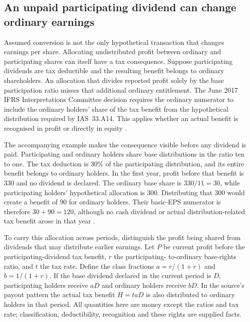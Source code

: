 \subsection{An unpaid participating dividend can change ordinary earnings}
\label{participating-tax-allocation}

Assumed conversion is not the only hypothetical transaction that changes
earnings per share. Allocating undistributed profit between ordinary and
participating shares can itself have a tax consequence. Suppose participating
dividends are tax deductible and the resulting benefit belongs to ordinary
shareholders. An allocation that divides reported profit solely by the base
participation ratio misses that additional ordinary entitlement. The June 2017
IFRS Interpretations Committee decision requires the ordinary numerator to
include the ordinary holders' share of the tax benefit from the hypothetical
distribution required by IAS~33.A14. This applies whether an actual benefit
is recognised in profit or directly in equity
\citep{ifric2017participatingtax}.

The accompanying example makes the consequence visible before any dividend
is paid. Participating and ordinary holders share base distributions in the
ratio ten to one. The tax deduction is 30\% of the participating distribution,
and its entire benefit belongs to ordinary holders. In the first year, profit
before that benefit is 330 and no dividend is declared. The ordinary base
share is \(330/11=30\), while participating holders' hypothetical allocation
is 300. Distributing that 300 would create a benefit of 90 for ordinary
holders. Their basic-EPS numerator is therefore \(30+90=120\), although no
cash dividend or actual distribution-related tax benefit arose in that year
\citep[pp.~1--5]{ifric2017participatingtaxexample}.

To carry this allocation across periods, distinguish the profit being shared
from dividends that may distribute earlier earnings. Let \(P\) be current
profit before the participating-dividend tax benefit, \(r\) the participating-
to-ordinary base-rights ratio, and \(t\) the tax rate. Define the class
fractions \(a=r/(1+r)\) and \(b=1/(1+r)\). If the base dividend declared
in the current period is \(D\), participating holders receive \(aD\) and
ordinary holders receive \(bD\). In the source's payout pattern the actual
tax benefit \(H=taD\) is also distributed to ordinary holders in that period.
All quantities here are money except the ratios and tax rate; classification,
deductibility, recognition and these rights are supplied facts.

